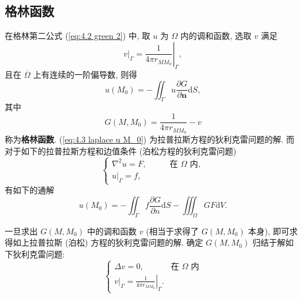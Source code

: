 \subsection{格林函数} \label{4 格林函数}
在格林第二公式 (\ref{eq:4.2 green 2}) 中, 取 $u$ 为 $\Omega$ 内的调和函数, 选取 $v$ 满足
\begin{equation}
    v|_\Gamma=\left.\frac{1}{4\pi r_{MM_0}}\right|_\Gamma,
\end{equation}
且在 $\overline{\Omega}$ 上有连续的一阶偏导数, 则得
\begin{equation} \label{eq:4.3 laplace u M_0}
    u(M_0)=-\iint_\Gamma u\frac{\partial G}{\partial\boldsymbol{n}}\mathrm{d}S,
\end{equation}
其中
\begin{equation} \label{eq:4.3 green func}
    G(M,M_0)=\frac{1}{4\pi r_{MM_0}}-v
\end{equation}
称为\textbf{格林函数}. (\ref{eq:4.3 laplace u M_0}) 为拉普拉斯方程的狄利克雷问题的解. 而对于如下的拉普拉斯方程和边值条件 (泊松方程的狄利克雷问题)
\begin{equation}
    \begin{cases}
        \nabla^2u=F, & \qquad \text{在 $\Omega$ 内}, \\
        u|_\Gamma=f,
    \end{cases}
\end{equation}
有如下的通解
\begin{equation}
    u(M_0)=-\iint_{\Gamma}f\frac{\partial G}{\partial n}\mathrm{d}S-\iiint_{\Omega}GF\mathrm{d}V.
\end{equation}

一旦求出 $G(M,M_0)$ 中的调和函数 $v$ (相当于求得了 $G(M,M_0)$ 本身), 即可求得如上拉普拉斯 (泊松) 方程的狄利克雷问题的解. 确定 $G(M,M_0)$ 归结于解如下狄利克雷问题:
\begin{equation}  \label{eq:4.3 v eq}
    \begin{cases}
        \Delta v=0, & \text{在 $\Omega$ 内} \\
        v|_\Gamma=\left.\frac{1}{4\pi r_{MM_0}}\right|_\Gamma.
    \end{cases}
\end{equation}
